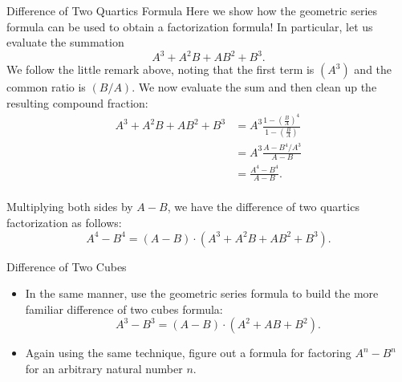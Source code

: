 \begin{example}{Difference of Two Quartics Formula}  Here we show how the geometric series formula can be used to obtain a factorization formula!  In particular, let us evaluate the summation $$A^3+A^2B+AB^2+B^3.$$  We follow the little remark above, noting that the first term is $\left(A^3\right)$ and the common ratio is $\left(B/A\right)$.  We now evaluate the sum and then clean up the resulting compound fraction:
\begin{align*}
A^3+A^2B+AB^2+B^3&=A^3\frac{1-\left(\frac{B}{A}\right)^4}{1-\left(\frac{B}{A}\right)}\\
&=A^3\frac{A-B^4/A^3}{A-B}\\
&=\frac{A^4-B^4}{A-B}.\\
\end{align*} 

Multiplying both sides by $A-B$, we have the difference of two quartics factorization as follows: $$A^4-B^4=(A-B)\cdot\left(A^3+A^2B+AB^2+B^3\right).$$
\end{example}

\begin{exercise}{Difference of Two Cubes}
\begin{itemize}
\item In the same manner, use the geometric series formula to build the more familiar difference of two cubes formula: $$A^3-B^3=(A-B)\cdot\left(A^2+AB+B^2\right).$$
\item Again using the same technique, figure out a formula for factoring $A^n-B^n$ for an arbitrary natural number $n$.
\end{itemize}
\end{exercise}

